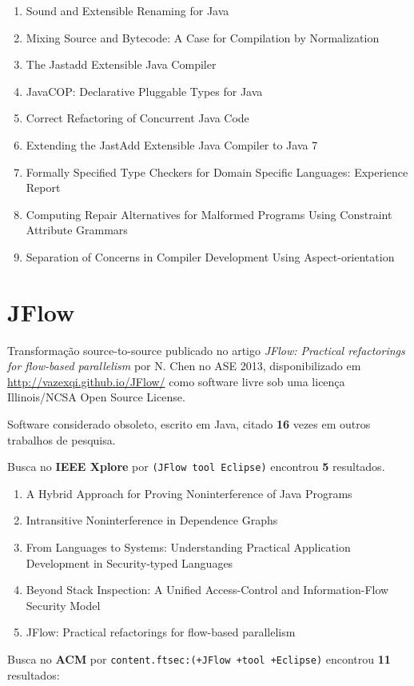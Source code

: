 \begin{enumerate}
\item Sound and Extensible Renaming for Java
\item Mixing Source and Bytecode: A Case for Compilation by Normalization
\item The Jastadd Extensible Java Compiler
\item JavaCOP: Declarative Pluggable Types for Java
\item Correct Refactoring of Concurrent Java Code
\item Extending the JastAdd Extensible Java Compiler to Java 7
\item Formally Specified Type Checkers for Domain Specific Languages: Experience Report
\item Computing Repair Alternatives for Malformed Programs Using Constraint Attribute Grammars
\item Separation of Concerns in Compiler Development Using Aspect-orientation
\end{enumerate}

\section{JFlow}

Transformação source-to-source
publicado no artigo {\it JFlow: Practical refactorings for flow-based parallelism}
por N. Chen
no ASE 2013,
disponibilizado em \url{http://vazexqi.github.io/JFlow/}
como software livre
sob uma licença Illinois/NCSA Open Source License.

Software considerado obsoleto,
escrito em Java,
citado {\bf 16} vezes em outros trabalhos de pesquisa.

Busca no {\bf IEEE Xplore} por
\texttt{(JFlow tool Eclipse)}
encontrou {\bf 5}
resultados.

\begin{enumerate}
\item A Hybrid Approach for Proving Noninterference of Java Programs
\item Intransitive Noninterference in Dependence Graphs
\item From Languages to Systems: Understanding Practical Application Development in Security-typed Languages
\item Beyond Stack Inspection: A Unified Access-Control and Information-Flow Security Model
\item JFlow: Practical refactorings for flow-based parallelism
\end{enumerate}

Busca no {\bf ACM} por
\texttt{content.ftsec:(+JFlow +tool +Eclipse)}
encontrou {\bf 11}
resultados:

